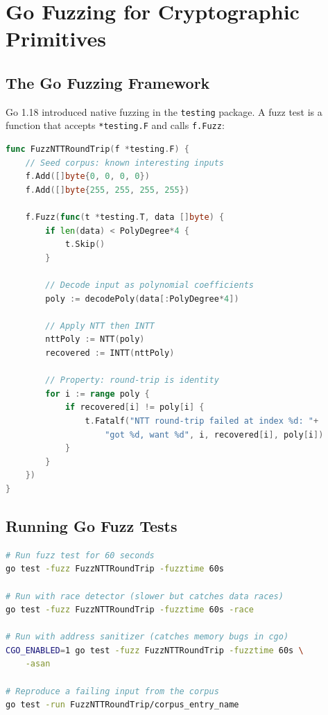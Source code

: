 \section{Go Fuzzing for Cryptographic Primitives}


\subsection{The Go Fuzzing Framework}

Go 1.18 introduced native fuzzing in the \texttt{testing} package. A fuzz test is a
function that accepts \texttt{*testing.F} and calls \texttt{f.Fuzz}:

\begin{lstlisting}[language=Go,caption={Basic Go fuzz test for NTT round-trip}]
func FuzzNTTRoundTrip(f *testing.F) {
    // Seed corpus: known interesting inputs
    f.Add([]byte{0, 0, 0, 0})
    f.Add([]byte{255, 255, 255, 255})

    f.Fuzz(func(t *testing.T, data []byte) {
        if len(data) < PolyDegree*4 {
            t.Skip()
        }

        // Decode input as polynomial coefficients
        poly := decodePoly(data[:PolyDegree*4])

        // Apply NTT then INTT
        nttPoly := NTT(poly)
        recovered := INTT(nttPoly)

        // Property: round-trip is identity
        for i := range poly {
            if recovered[i] != poly[i] {
                t.Fatalf("NTT round-trip failed at index %d: "+
                    "got %d, want %d", i, recovered[i], poly[i])
            }
        }
    })
}
\end{lstlisting}

\subsection{Running Go Fuzz Tests}

\begin{lstlisting}[language=bash,caption={Running Go fuzz tests}]
# Run fuzz test for 60 seconds
go test -fuzz FuzzNTTRoundTrip -fuzztime 60s

# Run with race detector (slower but catches data races)
go test -fuzz FuzzNTTRoundTrip -fuzztime 60s -race

# Run with address sanitizer (catches memory bugs in cgo)
CGO_ENABLED=1 go test -fuzz FuzzNTTRoundTrip -fuzztime 60s \
    -asan

# Reproduce a failing input from the corpus
go test -run FuzzNTTRoundTrip/corpus_entry_name
\end{lstlisting}

